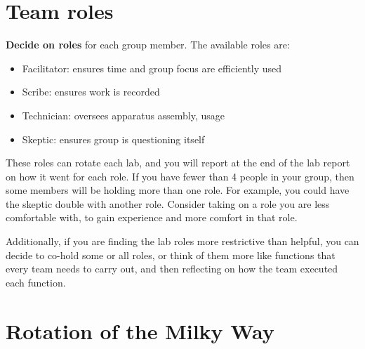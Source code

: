 \section{Team roles}

\textbf{Decide on roles} for each group member. The available roles are:
\begin{itemize}
	\item Facilitator: ensures time and group focus are efficiently used
	\item Scribe: ensures work is recorded
	\item Technician: oversees apparatus assembly, usage
	\item Skeptic: ensures group is questioning itself
\end{itemize}

These roles can rotate each lab, and you will report at the end of the lab report on how it went for each role. If you have fewer than 4 people in your group, then some members will be holding more than one role. For example, you could have the skeptic double with another role. Consider taking on a role you are less comfortable with, to gain experience and more comfort in that role.

Additionally, if you are finding the lab roles more restrictive than helpful, you can decide to co-hold some or all roles, or think of them more like functions that every team needs to carry out, and then reflecting on how the team executed each function.

\section{Rotation of the Milky Way}

